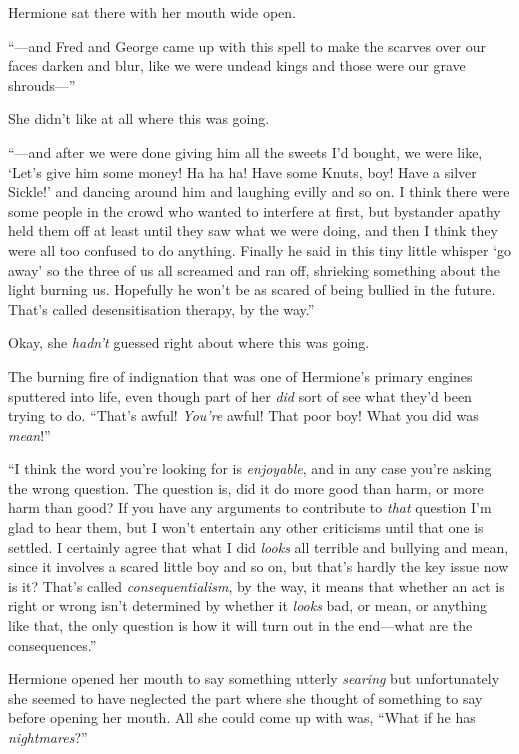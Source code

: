 Hermione sat there with her mouth wide open.

“—and Fred and George came up with this spell to make the scarves over our faces darken and blur, like we were undead kings and those were our grave shrouds—”

She didn’t like at all where this was going.

“—and after we were done giving him all the sweets I’d bought, we were like, ‘Let’s give him some money! Ha ha ha! Have some Knuts, boy! Have a silver Sickle!’ and dancing around him and laughing evilly and so on. I think there were some people in the crowd who wanted to interfere at first, but bystander apathy held them off at least until they saw what we were doing, and then I think they were all too confused to do anything. Finally he said in this tiny little whisper ‘go away’ so the three of us all screamed and ran off, shrieking something about the light burning us. Hopefully he won’t be as scared of being bullied in the future. That’s called desensitisation therapy, by the way.”

Okay, she \emph{hadn’t} guessed right about where this was going.

The burning fire of indignation that was one of Hermione’s primary engines sputtered into life, even though part of her \emph{did} sort of see what they’d been trying to do. “That’s awful! \emph{You’re} awful! That poor boy! What you did was \emph{mean}!”

“I think the word you’re looking for is \emph{enjoyable}, and in any case you’re asking the wrong question. The question is, did it do more good than harm, or more harm than good? If you have any arguments to contribute to \emph{that} question I’m glad to hear them, but I won’t entertain any other criticisms until that one is settled. I certainly agree that what I did \emph{looks} all terrible and bullying and mean, since it involves a scared little boy and so on, but that’s hardly the key issue now is it? That’s called \emph{consequentialism}, by the way, it means that whether an act is right or wrong isn’t determined by whether it \emph{looks} bad, or mean, or anything like that, the only question is how it will turn out in the end—what are the consequences.”

Hermione opened her mouth to say something utterly \emph{searing} but unfortunately she seemed to have neglected the part where she thought of something to say before opening her mouth. All she could come up with was, “What if he has \emph{nightmares}?”

